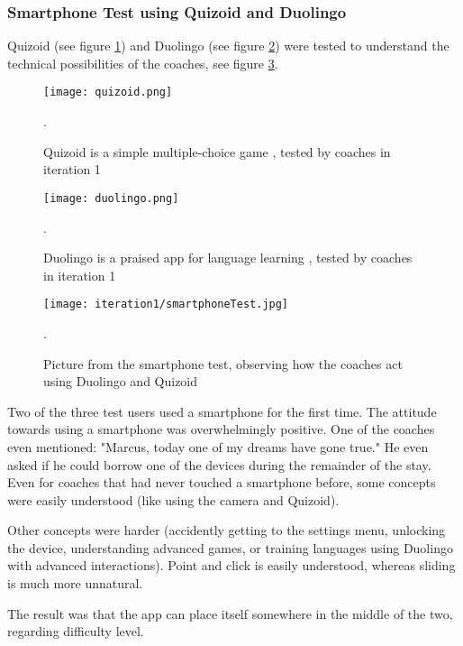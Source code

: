     \subsubsection{Smartphone Test using Quizoid and Duolingo}

    Quizoid (see figure \ref{fig:quizoid}) and Duolingo (see figure \ref{fig:duolingo}) were tested to understand the technical possibilities of the coaches, see figure \ref{fig:smartphoneTest}.

    \begin{figure}[h]
        \centering
        \texttt{[image: quizoid.png]}
        \caption{Quizoid is a simple multiple-choice game \citep{quizoid}, tested by coaches in iteration 1}.
        \label{fig:quizoid}
    \end{figure}

    \begin{figure}[h]
        \centering
        \texttt{[image: duolingo.png]}
        \caption{Duolingo is a praised app for language learning \citep{duolingo}, tested by coaches in iteration 1}.
        \label{fig:duolingo}
    \end{figure}

    \begin{figure}[h]
        \centering
        \texttt{[image: iteration1/smartphoneTest.jpg]}
        \caption{Picture from the smartphone test, observing how the coaches act using Duolingo and Quizoid}.
        \label{fig:smartphoneTest}
    \end{figure}

    Two of the three test users used a smartphone for the first time. The attitude towards using a smartphone was overwhelmingly positive. One of the coaches even mentioned: "Marcus, today one of my dreams have gone true." He even asked if he could borrow one of the devices during the remainder of the stay. Even for coaches that had never touched a smartphone before, some concepts were easily understood (like using the camera and Quizoid).

    Other concepts were harder (accidently getting to the settings menu, unlocking the device, understanding advanced games, or training languages using Duolingo with advanced interactions). Point and click is easily understood, whereas sliding is much more unnatural.

    The result was that the app can place itself somewhere in the middle of the two, regarding difficulty level.
